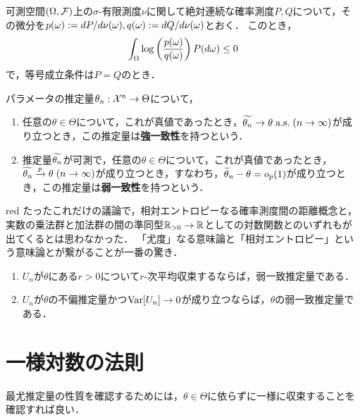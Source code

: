 \documentclass[uplatex,dvipdfmx]{jsreport}
\begin{document}
\begin{lemma}
    可測空間$(\Omega,\mathcal{F})$上の$\sigma$-有限測度$\nu$に関して絶対連続な確率測度$P,Q$について，その微分を$p(\omega):=dP/d\nu(\omega),q(\omega):=dQ/d\nu(\omega)$とおく．
    このとき，
    \[\int_\Omega\log\left(\frac{p(\omega)}{q(\omega)}\right)P(d\omega)\le 0\]
    で，等号成立条件は$P=Q$のとき．
\end{lemma}

\begin{definition}[consistency]
    パラメータの推定量$\theta_n:\mathcal{X}^n\to\Theta$について，
    \begin{enumerate}
        \item 任意の$\theta\in\Theta$について，これが真値であったとき，$\widetilde{\theta_n}\to\theta\;\mathrm{a.s.}\;(n\to\infty)$が成り立つとき，この推定量は\textbf{強一致性}を持つという．
        \item 推定量$\widetilde{\theta_n}$が可測で，任意の$\theta\in\Theta$について，これが真値であったとき，$\widetilde{\theta_n}\xrightarrow{p}\theta\;(n\to\infty)$が成り立つとき，すなわち，$\widetilde{\theta}_n-\theta=o_p(1)$が成り立つとき，この推定量は\textbf{弱一致性}を持つという．
    \end{enumerate}
\end{definition}

\begin{tbox}{red}{}
    たったこれだけの議論で，相対エントロピーなる確率測度間の距離概念と，実数の乗法群と加法群の間の準同型$\mathbb{R}_{>0}\to\mathbb{R}$としての対数関数とのいずれもが出てくるとは思わなかった．
    「尤度」なる意味論と「相対エントロピー」という意味論とが繋がることが一番の驚き．
\end{tbox}

\begin{lemma}\mbox{}
    \begin{enumerate}
        \item $U_n$が$\theta$にある$r>0$について$r$-次平均収束するならば，弱一致推定量である．
        \item $U_n$が$\theta$の不偏推定量かつ$\mathrm{Var}[U_n]\to0$が成り立つならば，$\theta$の弱一致推定量である．
    \end{enumerate}
\end{lemma}

\section{一様対数の法則}

\begin{tcolorbox}[colframe=ForestGreen, colback=ForestGreen!10!white,breakable,colbacktitle=ForestGreen!40!white,coltitle=black,fonttitle=\bfseries\sffamily,
title=]
    最尤推定量の性質を確認するためには，$\theta\in\Theta$に依らずに一様に収束することを確認すれば良い．
\end{tcolorbox}
\end{document}

